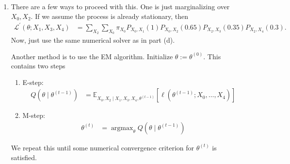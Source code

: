 \documentclass[11pt]{article}
\newcommand{\E}{\mathbb{E}}
\DeclareMathOperator*{\argmax}{argmax} %
\begin{document}
\begin{enumerate}[label=(\alph*)]
\item There are a few ways to proceed with this. One is just marginalizing over $X_0, X_2$. If we assume the process is already stationary, then
\begin{align*}
	\mathcal{L}^{\prime}(\theta ; X_1, X_3, X_4) &= \sum_{X_2} \sum_{X_0} \pi_{X_0} P_{X_0, X_1}(1) P_{X_0, X_2}(0.65) P_{X_2, X_3}(0.35) P_{X_2, X_4}(0.3).
\end{align*}
Now, just use the same numerical solver as in part (d).

Another method is to use the EM algorithm. Initialize $\theta := \theta^{(0)}$. This contains two steps
\begin{enumerate}[label=(\roman*)]
\item E-step:
\begin{align*}
	Q(\theta \mid \theta^{(t-1)}) &= \E_{X_0, X_2 \mid X_1, X_3, X_4, \theta^{(t-1)}} \left[ \ell(\theta^{(t-1)}; X_0, \dots, X_4) \right]
\end{align*}
\item M-step:
\begin{align*}
	\theta^{(t)} &= \argmax_{\theta} Q(\theta \mid \theta^{(t-1)}) 
\end{align*}
\end{enumerate}
We repeat this until some numerical convergence criterion for $\theta^{(t)}$ is satisfied.


\end{enumerate}



%
%
\end{document}
